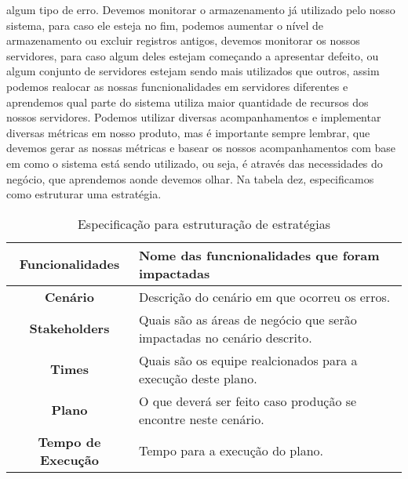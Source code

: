       algum tipo de erro. Devemos monitorar o armazenamento já utilizado pelo nosso
      sistema, para caso ele esteja no fim, podemos aumentar o nível de armazenamento
      ou excluir registros antigos, devemos monitorar os nossos servidores, para
      caso algum deles estejam começando a apresentar defeito, ou algum conjunto
      de servidores estejam sendo mais utilizados que outros, assim podemos realocar
      as nossas funcnionalidades em servidores diferentes e aprendemos qual parte
      do sistema utiliza maior quantidade de recursos dos nossos servidores. Podemos
      utilizar diversas acompanhamentos e implementar diversas métricas em nosso
      produto, mas é importante sempre lembrar, que devemos gerar as nossas métricas
      e basear os nossos acompanhamentos com base em como o sistema está sendo
      utilizado, ou seja, é através das necessidades do negócio, que aprendemos
      aonde devemos olhar. Na tabela dez, especificamos como estruturar uma
      estratégia.\newline

      \begin{table}[h!]
        \centering
        \begin{tabular}{|c|p{10cm}|}
          \hline
          \textbf{Funcionalidades} &
          Nome das funcnionalidades que foram impactadas \\ \hline
          \textbf{Cenário} &
          Descrição do cenário em que ocorreu os erros. \\ \hline
          \textbf{Stakeholders} &
          Quais são as áreas de negócio que serão impactadas no cenário descrito. \\ \hline
          \textbf{Times} &
          Quais são os equipe realcionados para a execução deste plano. \\ \hline
          \textbf{Plano} &
          O que deverá ser feito caso produção se encontre neste cenário. \\ \hline
          \textbf{Tempo de Execução} &
          Tempo para a execução do plano. \\ \hline
        \end{tabular}
        \caption{Especificação para estruturação de estratégias}
        \label{Tabela:11}
      \end{table}

